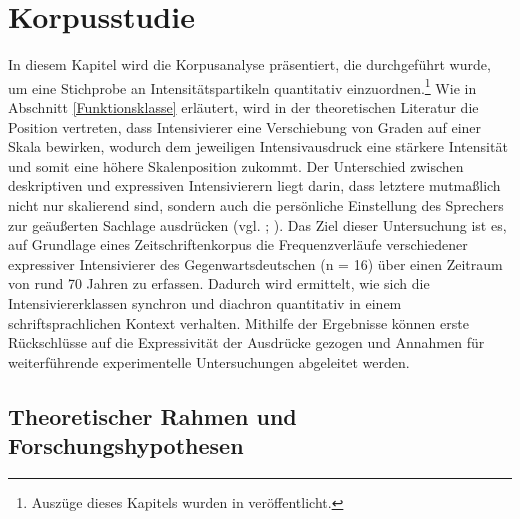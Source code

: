 %

\chapter{{Korpusstudie}} \label{Korpus}

In diesem Kapitel wird die Korpusanalyse präsentiert, die durchgeführt wurde, um eine Stichprobe an Intensitätspartikeln quantitativ einzuordnen.\footnote{Auszüge dieses Kapitels wurden in \citet[]{Schmidt.2022} veröffentlicht.} Wie in Abschnitt \ref{Funktionsklasse} erläutert, wird in der theoretischen Literatur die Position vertreten, dass Intensivierer eine Verschiebung von Graden auf einer Skala bewirken, wodurch dem jeweiligen Intensivausdruck eine stärkere Intensität und somit eine höhere Skalenposition zukommt. Der Unterschied zwischen deskriptiven und expressiven Intensivierern liegt darin, dass letztere mutmaßlich nicht nur skalierend sind, sondern auch die persönliche Einstellung des Sprechers zur geäußerten Sachlage ausdrücken (vgl. \citealt[315]{Lang.1983}; \citealt[57]{Ortner.2014}). Das Ziel dieser Untersuchung ist es, auf Grundlage eines Zeitschriftenkorpus die Frequenzverläufe verschiedener expressiver Intensivierer des Gegenwartsdeutschen (n = 16) über einen Zeitraum von rund 70 Jahren zu erfassen. Dadurch wird ermittelt, wie sich die Intensiviererklassen synchron und diachron quantitativ in einem schriftsprachlichen Kontext verhalten. Mithilfe der Ergebnisse können erste Rückschlüsse auf die Expressivität der Ausdrücke gezogen und Annahmen für weiterführende experimentelle Untersuchungen abgeleitet werden.

\section{Theoretischer Rahmen und Forschungshypothesen} \label{Forschungshypothesen-Korpus}

